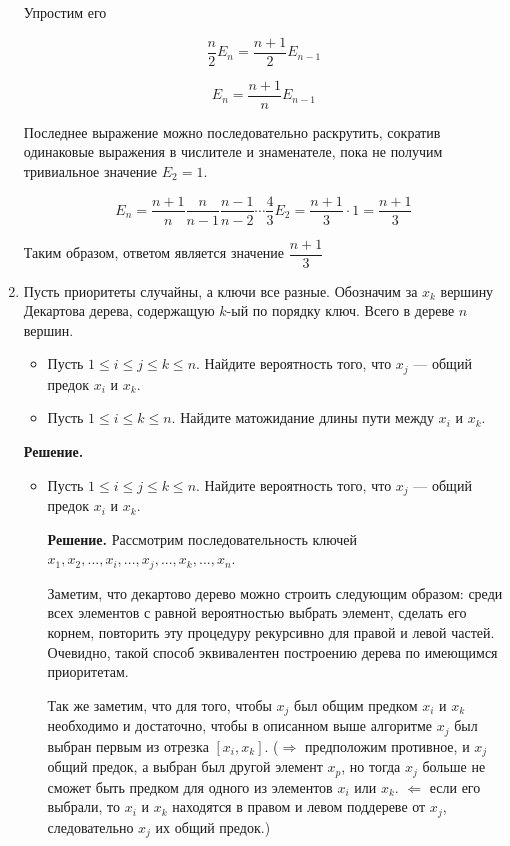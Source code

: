 \begin{enumerate}
	Упростим его
	
	$$\frac{n}{2} E_n = \frac{n + 1}{2}E_{n - 1}$$
	
	$$E_n = \frac{n + 1}{n} E_{n - 1}$$
	
	Последнее выражение можно последовательно раскрутить, сократив одинаковые выражения в числителе и знаменателе, пока не получим тривиальное значение $E_2 = 1$.
	
	$$E_n = \frac{n + 1}{n} \frac{n}{n - 1} \frac{n - 1}{n - 2} \cdots \frac{4}{3} E_2 = \frac{n + 1}{3} \cdot 1 = \frac{n + 1}{3}$$
	
	Таким образом, ответом является значение $\dfrac{n + 1}{3}$
	
	\item Пусть приоритеты случайны, а ключи все разные. Обозначим за $x_k$ вершину Декартова дерева,	содержащую $k$-ый по порядку ключ. Всего в дереве $n$ вершин.
	\begin{itemize}
		\item Пусть $1 \leqslant i \leqslant j \leqslant k \leqslant n$. Найдите вероятность того, что $x_j$ — общий предок $x_i$ и $x_k$.
		\item Пусть $1 \leqslant i \leqslant k \leqslant n$. Найдите матожидание длины пути между $x_i$ и $x_k$.
	\end{itemize}
	
	\textbf{Решение.}
	
	\begin{itemize}
		\item Пусть $1 \leqslant i \leqslant j \leqslant k \leqslant n$. Найдите вероятность того, что $x_j$ — общий предок $x_i$ и $x_k$.
		
		\textbf{Решение.} Рассмотрим последовательность ключей $x_1, x_2, ..., x_i, ..., x_j,..., x_k, ..., x_n$.
		
		Заметим, что декартово дерево можно строить следующим образом: среди всех элементов с равной вероятностью выбрать элемент, сделать его корнем, повторить эту процедуру рекурсивно для правой и левой частей. Очевидно, такой способ эквивалентен построению дерева по имеющимся приоритетам.
		
		Так же заметим, что для того, чтобы $x_j$ был общим предком $x_i$ и $x_k$ необходимо и достаточно, чтобы в описанном выше алгоритме $x_j$ был выбран первым из отрезка $[x_i, x_k]$. ($\Rightarrow$ предположим противное, и $x_j$ общий предок, а выбран был другой элемент $x_p$, но тогда $x_j$ больше не сможет быть предком для одного из элементов $x_i$ или $x_k$. $\Leftarrow$ если его выбрали, то $x_i$ и $x_k$ находятся в правом и левом поддереве от $x_j$, следовательно $x_j$ их общий предок.)
		

\end{itemize}
\end{enumerate}
